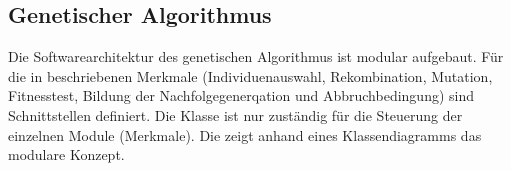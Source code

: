 \subsection{Genetischer Algorithmus}
\label{sec:ArchtikturGenetischerAlgorithmus}
Die Softwarearchitektur des genetischen Algorithmus ist modular aufgebaut. Für die in  beschriebenen Merkmale (Individuenauswahl, Rekombination, Mutation, Fitnesstest, Bildung der Nachfolgegenerqation und Abbruchbedingung) sind Schnittstellen definiert. Die Klasse  ist nur zuständig für die Steuerung der einzelnen Module (Merkmale). Die  zeigt anhand eines Klassendiagramms das modulare Konzept.

